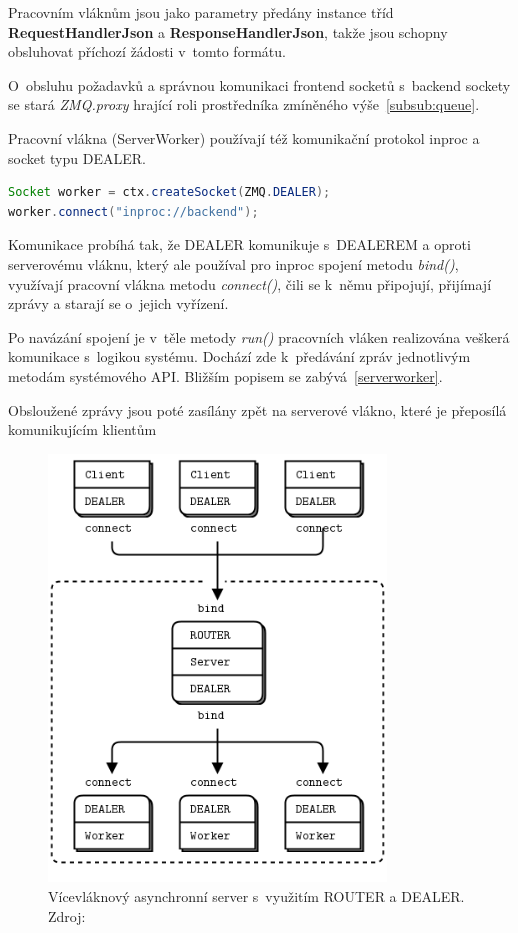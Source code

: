 \documentclass[thesis=M,czech]{FITthesis}[2014/05/07]
\begin{document}
Pracovním vláknům jsou jako parametry předány instance tříd \textbf{RequestHandlerJson} a \textbf{ResponseHandlerJson}, takže jsou schopny obsluhovat příchozí žádosti v~tomto formátu.

O~obsluhu požadavků a správnou komunikaci frontend socketů s~backend sockety se stará \emph{ZMQ.proxy} hrající roli prostředníka zmíněného výše~\ref{subsub:queue}.

Pracovní vlákna (ServerWorker) používají též komunikační protokol inproc a socket typu DEALER.

\begin{lstlisting}[language=java]
Socket worker = ctx.createSocket(ZMQ.DEALER);
worker.connect("inproc://backend");
\end{lstlisting}

Komunikace probíhá tak, že DEALER komunikuje s~DEALEREM a oproti serverovému vláknu, který ale používal pro inproc spojení metodu \emph{bind()}, využívají pracovní vlákna metodu \emph{connect()}, čili se k~němu připojují, přijímají zprávy a starají se o~jejich vyřízení.

Po navázání spojení je v~těle metody \emph{run()} pracovních vláken realizována veškerá komunikace s~logikou systému. Dochází zde k~předávání zpráv jednotlivým metodám systémového API. Bližším popisem se zabývá~\ref{serverworker}. 

Obsloužené zprávy jsou poté zasílány zpět na serverové vlákno, které je přeposílá komunikujícím klientům

\begin{figure}\centering
	\includegraphics[width=0.8\textwidth]{obr/multithreadingServer.png}
 	\caption[Vícevláknový asynchronní server s~využitím ROUTER a DEALER.]{Vícevláknový asynchronní server s~využitím ROUTER a DEALER. Zdroj: \cite{mtserver}}\label{fig:mtserver}
\end{figure}	
\end{document}
